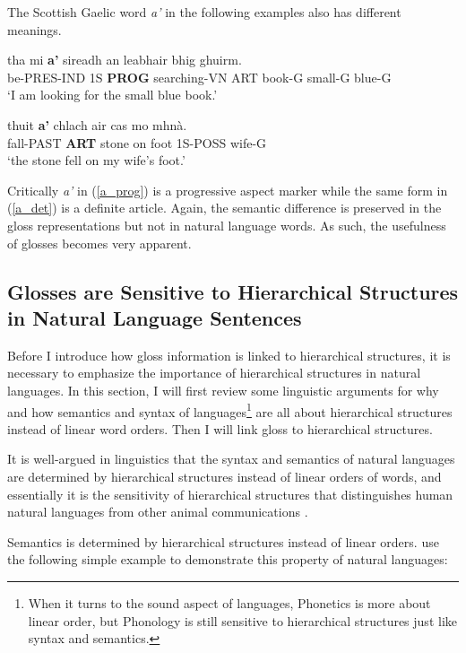 \documentclass[final]{ua-thesis}
\numberwithin{equation}{section}
\begin{document}
The Scottish Gaelic word \textit{a'} in the following examples also has different meanings.  

\begin{exe}  
\ex \label{a_prog}
\gll tha mi \textbf{a'} sireadh an leabhair bhig ghuirm.\\
be-PRES-IND 1S \textbf{PROG} searching-VN ART book-G small-G blue-G\\
\glt `I am looking for the small blue book.' \citep[p. 29]{lamb2001scottish}

\ex \label{a_det}
\gll thuit \textbf{a'} chlach air cas mo mhn\`a.\\
fall-PAST \textbf{ART} stone on foot 1S-POSS wife-G\\
\glt`the stone fell on my wife's foot.' \citep[p. 30]{lamb2001scottish} 	
\end{exe}

Critically \textit{a'} in (\ref{a_prog}) is a progressive aspect marker while the same form in (\ref{a_det}) is a definite article. Again, the semantic difference is preserved in the gloss representations but not in natural language words. As such, the usefulness of glosses becomes very apparent.  

\subsection{Glosses are Sensitive to Hierarchical Structures in Natural Language Sentences}

Before I introduce how gloss information is linked to hierarchical structures, it is necessary to emphasize the importance of hierarchical structures in natural languages. In this section, I will first review some linguistic arguments for why and how semantics and syntax of languages\footnote{When it turns to the sound aspect of languages, Phonetics is more about linear order, but Phonology is still sensitive to hierarchical structures just like syntax and semantics. } are all about hierarchical structures instead of linear word orders. Then I will link gloss to hierarchical structures.

It is well-argued in linguistics that the syntax and semantics of natural languages are determined by hierarchical structures instead of linear orders of words, and essentially it is the sensitivity of hierarchical structures that distinguishes human natural languages from other animal communications \citep{berwick2015only}.     

Semantics is determined by hierarchical structures instead of linear orders. \citet[p. 117]{berwick2015only} use the following simple example to demonstrate this property of natural languages:
\end{document}
